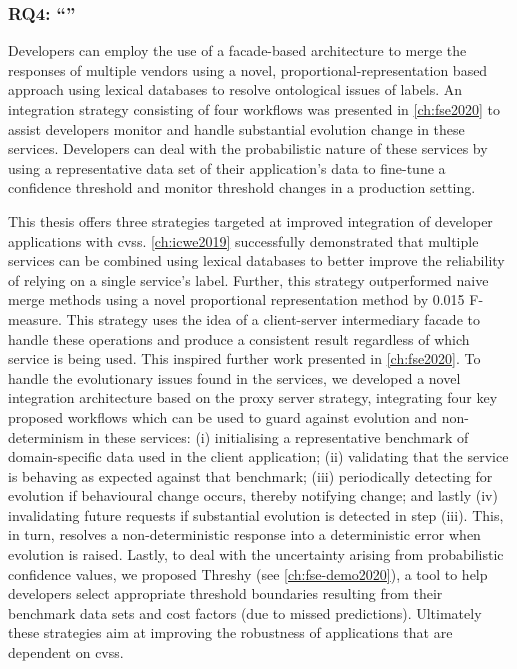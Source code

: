 \subsubsection*{RQ4: ``\RQFourDesign{}''}
\begin{callout}
Developers can employ the use of a facade-based architecture to merge the responses of \textup{multiple} vendors using a novel, proportional-representation based approach using lexical databases to resolve ontological issues of labels. An integration strategy consisting of four workflows was presented in \cref{ch:fse2020} to assist developers monitor and handle substantial evolution change in these services. Developers can deal with the probabilistic nature of these services by using a representative data set of their application's data to fine-tune a confidence threshold and monitor threshold changes in a production setting.
\end{callout}

This thesis offers three strategies targeted at improved integration of developer applications with \glspl{cvs}. \cref{ch:icwe2019} successfully demonstrated that multiple services can be combined using lexical databases to better improve the reliability of relying on a single service's label. Further, this strategy outperformed naive merge methods using a novel proportional representation method by 0.015 F-measure. This strategy uses the idea of a client-server intermediary facade to handle these operations and produce a consistent result regardless of which service is being used. This inspired further work presented in \cref{ch:fse2020}. To handle the evolutionary issues found in the services, we developed a novel integration architecture based on the proxy server strategy, integrating four key proposed workflows which can be used to guard against evolution and non-determinism in these services: (i) initialising a representative benchmark of domain-specific data used in the client application; (ii) validating that the service is behaving as expected against that benchmark; (iii) periodically detecting for evolution if behavioural change occurs, thereby notifying change; and lastly (iv) invalidating future requests if substantial evolution is detected in step (iii). This, in turn, resolves a non-deterministic response into a deterministic error when evolution is raised. Lastly, to deal with the uncertainty arising from probabilistic confidence values, we proposed Threshy (see \cref{ch:fse-demo2020}), a tool to help developers select appropriate threshold boundaries resulting from their benchmark data sets and cost factors (due to missed predictions). Ultimately these strategies aim at improving the robustness of applications that are dependent on \glspl{cvs}.

